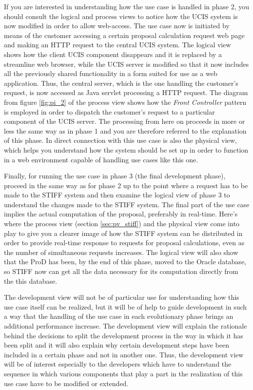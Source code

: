 If you are interested in understanding how the use case is handled in phase 2, you should consult the
logical and process views to notice how the UCIS system is now modified in order to allow web-access.
The use case now is initiated by means of the customer
accessing a certain proposal calculation request web page and making an HTTP request to the central UCIS
system. The logical view shows how the client UCIS component disappears and it is replaced by a
streamline web browser, while the UCIS server is modified so that it now includes all the previously
shared functionality in a form suited for use as a web application. Thus, the central server, which is the
one handling the customer's request, is now accessed as Java servlet processing a HTTP request. The diagram
from figure \ref{fig:pi_2} of the process view shows how the \textit{Front Controller} pattern is employed in order
to dispatch the customer's request to a particular component of the UCIS server. The processing from here on
proceeds in more or less the same way as in phase 1 and you are therefore referred to the explanation of
this phase. In direct connection with this use case is also the physical view, which helps you understand how
the system should be set up in order to function in a web environment capable of handling use cases like
this one.

Finally, for running the use case in phase 3 (the final development phase), proceed in the same way as for
phase 2 up to the point where a request has to be made to the STIFF system and then examine the logical
view of phase 3 to understand the changes made to the STIFF system. The final part of the use case
implies the actual computation of the proposal, preferably in real-time. Here's where the process view
(section \ref{sec:pv_stiff}) and the physical view come into play to give you a clearer image of how the
STIFF system can be distributed in
order to provide real-time response to requests for proposal calculations, even as the number of simultaneous
requests increases. The logical view will also show that the ProD has been, by the end of this phase, moved
to the Oracle database, so STIFF now can get all the data necessary for its computation directly from the
this database.

The development view will not be of particular use for understanding how this use case itself can be realized,
but it will be of help to guide development in such a way that the handling of the use case in each evolutionary
phase brings an additional performance increase. The development view will explain the rationale behind the
decisions to split the development process in the way in which it has been split and it will also explain
why certain development steps have been included in a certain phase and not in another one. Thus, the
development view will be of interest especially to the developers which have to understand the sequence
in which various components that play a part in the realization of this use case have to be modified or
extended.

